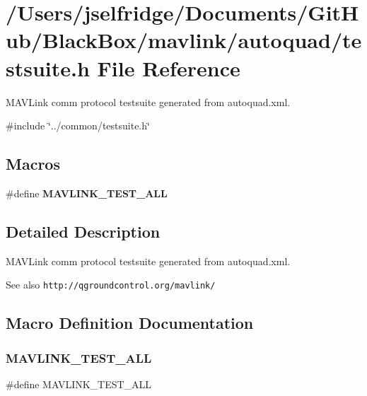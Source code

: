 \section{/\+Users/jselfridge/\+Documents/\+Git\+Hub/\+Black\+Box/mavlink/autoquad/testsuite.h File Reference}
\label{autoquad_2testsuite_8h}


M\+A\+V\+Link comm protocol testsuite generated from autoquad.\+xml.  


{\ttfamily \#include \char`\"{}../common/testsuite.\+h\char`\"{}}\newline
\subsection*{Macros}
\begin{DoxyCompactItemize}
\item 
\#define \textbf{ M\+A\+V\+L\+I\+N\+K\+\_\+\+T\+E\+S\+T\+\_\+\+A\+LL}
\end{DoxyCompactItemize}


\subsection{Detailed Description}
M\+A\+V\+Link comm protocol testsuite generated from autoquad.\+xml. 

\begin{DoxySeeAlso}{See also}
{\tt http\+://qgroundcontrol.\+org/mavlink/} 
\end{DoxySeeAlso}


\subsection{Macro Definition Documentation}
\mbox{\label{autoquad_2testsuite_8h_ae706a993ca59ccc1a8a7c330f0b1ceec}} 
\subsubsection{M\+A\+V\+L\+I\+N\+K\+\_\+\+T\+E\+S\+T\+\_\+\+A\+LL}
{\footnotesize\ttfamily \#define M\+A\+V\+L\+I\+N\+K\+\_\+\+T\+E\+S\+T\+\_\+\+A\+LL}

